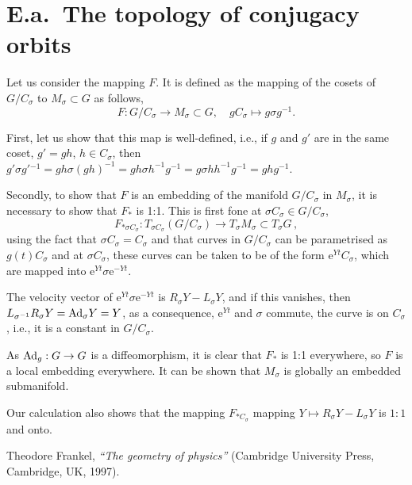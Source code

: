 \documentclass[a4paper,12pt]{article}
\def\e{\mathrm{e}}
\begin{document}
\section*{E.a.\ The topology of conjugacy orbits}

Let us consider the mapping $F$. It is defined as the mapping of the cosets of $G/C_\sigma$ to $M_\sigma \subset G$ as follows,
\[
 F : G/C_\sigma \to M_\sigma \subset G, \quad gC_\sigma \mapsto g\sigma g^{-1}.
\]

First, let us show that this map is well-defined, i.e., if $g$ and $g'$ are in the same coset, $g' =gh$, $h\in C_\sigma$, then $g' \sigma g'{}^{-1}  = g h \sigma (gh)^{-1} = g h \sigma h^{-1}g^{-1} = g \sigma h h^{-1}g^{-1}=ghg^{-1}$.

Secondly, to show that $F$ is an embedding of the manifold $G/C_\sigma$ in $M_\sigma$, it is necessary to show that $F_*$ is 1:1. This is first fone at $\sigma C_\sigma \in G/C_\sigma$,
\[
 F_{* \sigma C_\sigma} : T_{\sigma C_\sigma} (G/C_\sigma) \to T_{\sigma} M_\sigma \subset T_\sigma G\,,
\]
using the fact that $\sigma C_\sigma=C_\sigma$ and that curves in $G/C_\sigma$ can be parametrised as $g(t) C_\sigma$ and at $\sigma C_\sigma$, these curves can be taken to be of the form $\e^{Yt}C_\sigma$, which are mapped into $\e^{Yt}\sigma \e^{-Yt}$.

The velocity vector of $\e^{Yt}\sigma \e^{-Yt}$ is $R_\sigma Y - L_\sigma Y$, and if this vanishes, then $L_{\sigma^{-1}}R_\sigma Y = {\rm Ad}_\sigma Y = Y$, as a consequence, $\e^{Yt}$ and $\sigma$ commute, the curve is on $C_\sigma$, i.e., it is a constant in $G/C_\sigma$.

As ${\rm Ad}_g : G\to G$ is a diffeomorphism, it is clear that $F_*$ is 1:1 everywhere, so $F$ is a local embedding everywhere. It can be shown that $M_\sigma$ is globally an embedded submanifold.

Our calculation also shows that the mapping $F_{*C_\sigma}$ mapping $Y\mapsto R_\sigma Y - L_\sigma Y$ is $1:1$ and onto.










\begin{thebibliography}{99}
 Theodore Frankel, {\sl ``The geometry of physics''}\/ (Cambridge University Press, Cambridge,
UK, 1997).

\end{thebibliography}
\end{document}
